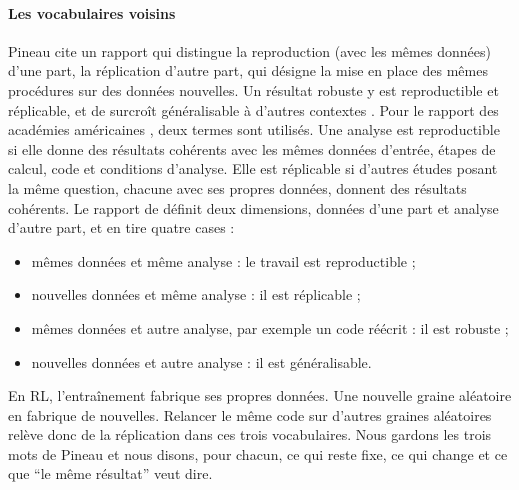 \paragraph{Les vocabulaires voisins}
Pineau cite un rapport qui distingue la reproduction (avec les mêmes données) d'une part, la réplication
d'autre part, qui désigne la mise en place des mêmes procédures sur des données nouvelles. Un résultat
robuste y est reproductible et réplicable, et de surcroît généralisable à d'autres
contextes \parencite[p.~3]{bollen2015robust}. Pour le rapport des académies
américaines \parencite[résumé, p.~1]{nasem2019reproducibility}, deux termes sont utilisés. Une analyse
est reproductible si elle donne des résultats cohérents avec les mêmes données d'entrée, étapes de
calcul, code et conditions d'analyse. Elle est réplicable si d'autres études posant la même question,
chacune avec ses propres données, donnent des résultats cohérents. Le rapport de
\textcite[section~2.1, figure~1]{pineau2021improving} définit deux dimensions, données d'une part et
analyse d'autre part, et en tire quatre cases :
\begin{itemize}
  \item mêmes données et même analyse : le travail est reproductible ;
  \item nouvelles données et même analyse : il est réplicable ;
  \item mêmes données et autre analyse, par exemple un code réécrit : il est robuste ;
  \item nouvelles données et autre analyse : il est généralisable.
\end{itemize}
En RL, l'entraînement fabrique ses propres données. Une
nouvelle graine aléatoire en fabrique de nouvelles. Relancer le même code sur d'autres graines
aléatoires relève donc de la réplication dans ces trois vocabulaires. Nous gardons les trois mots de
Pineau et nous disons, pour chacun, ce qui reste fixe, ce qui change et ce que \enquote{le même résultat}
veut dire.

